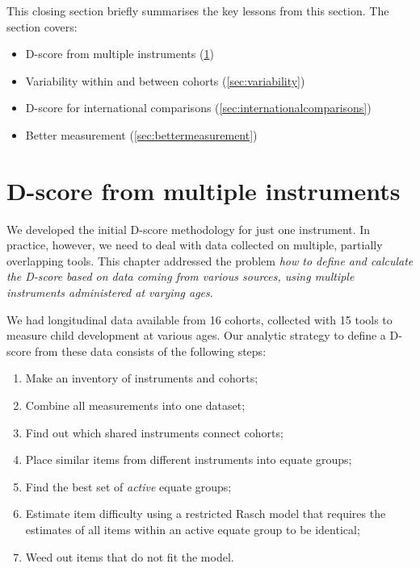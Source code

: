 \documentclass[
]{book}
\providecommand{\tightlist}{%
  \setlength{\itemsep}{0pt}\setlength{\parskip}{0pt}}
\begin{document}
This closing section briefly summarises the key lessons from this section. The section covers:

\begin{itemize}
\tightlist
\item
  D-score from multiple instruments (\ref{sec:multipleinstruments})
\item
  Variability within and between cohorts (\ref{sec:variability})
\item
  D-score for international comparisons (\ref{sec:internationalcomparisons})
\item
  Better measurement (\ref{sec:bettermeasurement})
\end{itemize}

\hypertarget{sec:multipleinstruments}{%
\section{D-score from multiple instruments}\label{sec:multipleinstruments}}

We developed the initial D-score methodology for just one instrument. In practice, however, we need to deal with data collected on multiple, partially overlapping tools. This chapter addressed the problem \emph{how to define and calculate the D-score based on data coming from various sources, using multiple instruments administered at varying ages}.

We had longitudinal data available from 16 cohorts, collected with 15 tools to measure child development at various ages. Our analytic strategy to define a D-score from these data consists of the following steps:

\begin{enumerate}
\def\labelenumi{\arabic{enumi}.}
\tightlist
\item
  Make an inventory of instruments and cohorts;
\item
  Combine all measurements into one dataset;
\item
  Find out which shared instruments connect cohorts;
\item
  Place similar items from different instruments into equate groups;
\item
  Find the best set of \emph{active} equate groups;
\item
  Estimate item difficulty using a restricted Rasch model that requires the estimates of all items within an active equate group to be identical;
\item
  Weed out items that do not fit the model.
\end{enumerate}
\end{document}
